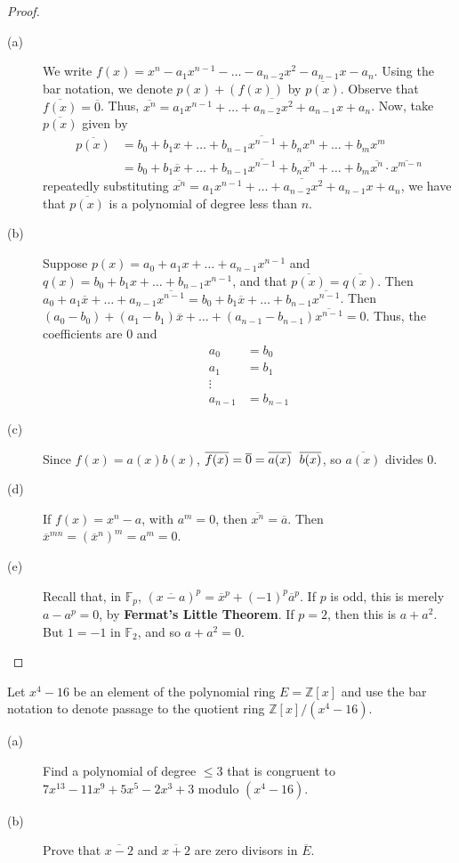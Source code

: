 \documentclass[12pt,leqno]{book}
\numberwithin{equation}{section}
\newcommand{\question}[2] {\vspace{.25in}\noindent\fbox{#1} #2 \vspace{.10in}}
\theoremstyle{definition}
\begin{document}
\begin{proof}\indent
\begin{description}
 \item [(a)] We write $f(x)=x^n-a_1x^{n-1}-\hdots-a_{n-2}x^2-a_{n-1}x-a_n$. Using the bar notation, we denote $p(x)+(f(x))$ by $\overline{p(x)}$. Observe that $\overline{f(x)}=\overline{0}$. Thus, $\overline{x^n}=\overline{a_1x^{n-1}+\hdots+a_{n-2}x^2+a_{n-1}x+a_n}$. Now, take $\overline{p(x)}$ given by \begin{align*}\overline{p(x)}&=\overline{b_0+b_1x+\hdots+b_{n-1}x^{n-1}+b_nx^n+\hdots+b_mx^m}\\&=b_0+b_1\overline{x}+\hdots+b_{n-1}\overline{x^{n-1}}+b_n\overline{x^n}+\hdots+b_m\overline{x^n}\cdot\overline{x^{m-n}}\end{align*} repeatedly substituting $\overline{x^n}=\overline{a_1x^{n-1}+\hdots+a_{n-2}x^2+a_{n-1}x+a_n}$, we have that $\overline{p(x)}$ is a polynomial of degree less than $n$.
 \item [(b)] Suppose $p(x)=a_0+a_1x+\hdots+a_{n-1}x^{n-1}$ and $q(x)=b_0+b_1x+\hdots+b_{n-1}x^{n-1}$, and that $\overline{p(x)}=\overline{q(x)}$. Then $a_0+a_1\overline{x}+\hdots+a_{n-1}\overline{x^{n-1}}=b_0+b_1\overline{x}+\hdots+b_{n-1}\overline{x^{n-1}}$. Then $(a_0-b_0)+(a_1-b_1)\overline{x}+\hdots+(a_{n-1}-b_{n-1})\overline{x^{n-1}}=0$. Thus, the coefficients are 0 and \begin{align*}a_0&=b_0\\a_1&=b_1\\\vdots\\a_{n-1}&=b_{n-1}\end{align*}
 \item [(c)] Since $f(x)=a(x)b(x)$, $\overline{f(x)}=\overline{0}=\overline{a(x)}\hskip.09in\overline{b(x)}$, so $\overline{a(x)}$ divides 0.
 \item [(d)] If $f(x)=x^n-a$, with $a^m=0$, then $\overline{x^n}=\overline{a}$. Then $\overline{x}^{mn}=(\overline{x}^n)^m=a^m=0$.
 \item [(e)] Recall that, in $\mathbb{F}_p$, $(\overline{x-a})^p=\overline{x}^p+(-1)^p\overline{a}^p$. If $p$ is odd, this is merely $a-a^p=0$, by \textbf{Fermat's Little Theorem}. If $p=2$, then this is $a+a^2$. But $1=-1$ in $\mathbb{F}_2$, and so $a+a^2=0$.\qedhere  
\end{description}
\end{proof}


\question{16}{Let $x^4-16$ be an element of the polynomial ring $E=\mathbb{Z}[x]$ and use the bar notation to denote passage to the quotient ring $\mathbb{Z}[x]/(x^4-16)$.}
\begin{description}
 \item [(a)] Find a polynomial of degree $\leq3$ that is congruent to $7x^{13}-11x^9+5x^5-2x^3+3$ modulo $(x^4-16)$.
 \item [(b)] Prove that $\overline{x-2}$ and $\overline{x+2}$ are zero divisors in $\overline{E}$.
\end{description}
\end{document}
